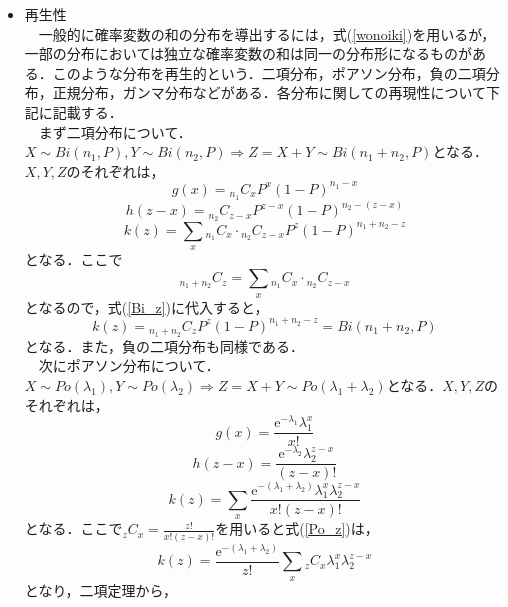 \documentclass[autodetect-engine,dvipdfmx-if-dvi,ja=standard,a4paper,11pt]{bxjsarticle} %
\begin{document}
\begin{itemize}
\item 再生性\\
 　一般的に確率変数の和の分布を導出するには，式(\ref{wonoiki})を用いるが，一部の分布においては独立な確率変数の和は同一の分布形になるものがある．このような分布を再生的という．二項分布，ポアソン分布，負の二項分布，正規分布，ガンマ分布などがある．各分布に関しての再現性について下記に記載する．\\
 　まず二項分布について．$X\sim Bi(n_1,P),Y\sim Bi(n_2,P)\Rightarrow Z=X+Y\sim Bi(n_1+n_2,P)$となる．$X,Y,Z$のそれぞれは，
\begin{equation}
g(x)={}_{n_1} C_xP^x(1-P)^{n_1-x}
\end{equation}
\begin{equation}
h(z-x)={}_{n_2} C_{z-x}P^{z-x}(1-P)^{n_2-(z-x)}
\end{equation}
\begin{equation}
\label{Bi_z}
k(z)=\displaystyle\sum_{x}{}_{n_1} C_x\cdot{}_{n_2} C_{z-x}P^z(1-P)^{n_1+n_2-z}
\end{equation}
となる．ここで
\begin{equation}
{}_{n_1+n_2} C_z=\displaystyle\sum_{x}{}_{n_1} C_x\cdot{}_{n_2} C_{z-x}
\end{equation} 
となるので，式(\ref{Bi_z})に代入すると，
\begin{equation}
k(z)={}_{n_1+n_2} C_zP^z(1-P)^{n_1+n_2-z}=Bi(n_1+n_2,P)
\end{equation}
となる．また，負の二項分布も同様である．\\
　次にポアソン分布について．$X\sim Po(\lambda_1),Y\sim Po(\lambda_2)\Rightarrow Z=X+Y\sim Po(\lambda_1+\lambda_2)$となる．$X,Y,Z$のそれぞれは，
\begin{equation}
g(x)=\frac{\mathrm{e}^{-\lambda_1}\lambda_1^x}{x!}
\end{equation}
\begin{equation}
h(z-x)=\frac{\mathrm{e}^{-\lambda_2}\lambda_2^{z-x}}{(z-x)!}
\end{equation}
\begin{equation}
\label{Po_z}
k(z)=\displaystyle\sum_{x}\frac{\mathrm{e}^{-(\lambda_1+\lambda_2)}\lambda_1^x\lambda_2^{z-x}}{x!(z-x)!}
\end{equation}
となる．ここで${}_{z} C_x=\frac{z!}{x!(z-x)!}$を用いると式(\ref{Po_z})は，
\begin{equation}
k(z)=\frac{\mathrm{e}^{-(\lambda_1+\lambda_2)}}{z!}\displaystyle\sum_{x}{}_{z} C_x\lambda_1^x\lambda_2^{z-x}
\end{equation} 
となり，二項定理から，
\begin{equation} 

\end{equation}
\end{itemize}
\end{document}
